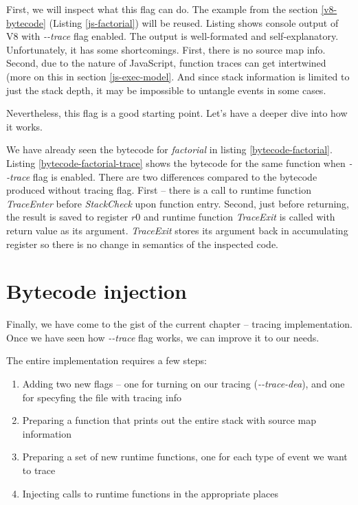 First, we will inspect what this flag can do. The example from the section \ref{v8-bytecode} (Listing \ref{js-factorial}) will be reused.
Listing shows console output of V8 with \emph{-{}-trace} flag enabled. The output is well-formated and self-explanatory.
Unfortunately, it has some shortcomings. First, there is no source map info. Second, due to the nature of JavaScript,
function traces can get intertwined (more on this in section \ref{js-exec-model}. And since stack information is limited to
just the stack depth, it may be impossible to untangle events in some cases.



Nevertheless, this flag is a good starting point. Let's have a deeper dive into how it works.

We have already seen the bytecode for \emph{factorial} in listing \ref{bytecode-factorial}.
Listing \ref{bytecode-factorial-trace} shows the bytecode for the same function when \emph{-{}-trace}
flag is enabled. There are two differences compared to the bytecode produced without tracing flag.
First -- there is a call to runtime function \emph{TraceEnter} before \emph{StackCheck} upon function entry. 
Second, just before returning, the result is saved to register $r0$ and runtime function \emph{TraceExit} is called
with return value as its argument. \emph{TraceExit} stores its argument back in accumulating register so there
is no change in semantics of the inspected code.




\section{Bytecode injection}
\label{v8-bytecode-injection}

Finally, we have come to the gist of the current chapter -- tracing implementation.
Once we have seen how \emph{-{}-trace} flag works, we can improve it to our needs.

The entire implementation requires a few steps:
\begin{enumerate}
  \item Adding two new flags -- one for turning on our tracing (\emph{-{}-trace-dea}), and one for specyfing the file with tracing info
  \item Preparing a function that prints out the entire stack with source map information
  \item Preparing a set of new runtime functions, one for each type of event we want to trace
  \item Injecting calls to runtime functions in the appropriate places
\end{enumerate}

